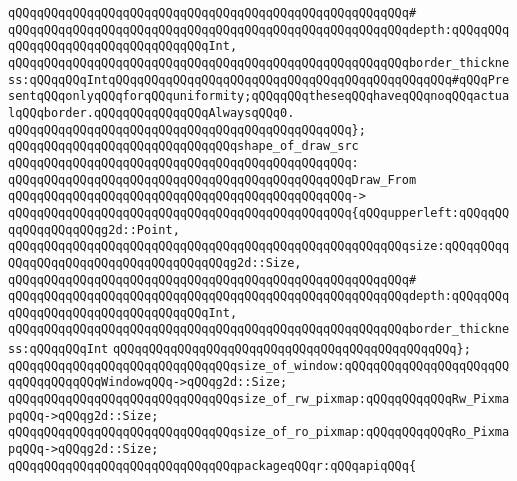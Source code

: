 \verb|qQQqqQQqqQQqqQQqqQQqqQQqqQQqqQQqqQQqqQQqqQQqqQQqqQQqqQQq#|\newline
\verb|qQQqqQQqqQQqqQQqqQQqqQQqqQQqqQQqqQQqqQQqqQQqqQQqqQQqqQQqdepth:qQQqqQQqqQQqqQQqqQQqqQQqqQQqqQQqqQQqInt,|\newline
\verb|qQQqqQQqqQQqqQQqqQQqqQQqqQQqqQQqqQQqqQQqqQQqqQQqqQQqqQQqborder_thickness:qQQqqQQqIntqQQqqQQqqQQqqQQqqQQqqQQqqQQqqQQqqQQqqQQqqQQqqQQq#qQQqPresentqQQqonlyqQQqforqQQquniformity;qQQqqQQqtheseqQQqhaveqQQqnoqQQqactualqQQqborder.qQQqqQQqqQQqqQQqAlwaysqQQq0.|\newline
\verb|qQQqqQQqqQQqqQQqqQQqqQQqqQQqqQQqqQQqqQQqqQQqqQQq};|\newline
\newline
\verb|qQQqqQQqqQQqqQQqqQQqqQQqqQQqqQQqshape_of_draw_src|\newline
\verb|qQQqqQQqqQQqqQQqqQQqqQQqqQQqqQQqqQQqqQQqqQQqqQQq:|\newline
\verb|qQQqqQQqqQQqqQQqqQQqqQQqqQQqqQQqqQQqqQQqqQQqqQQqDraw_From|\newline
\verb|qQQqqQQqqQQqqQQqqQQqqQQqqQQqqQQqqQQqqQQqqQQqqQQq->|\newline
\verb|qQQqqQQqqQQqqQQqqQQqqQQqqQQqqQQqqQQqqQQqqQQqqQQq{qQQqupperleft:qQQqqQQqqQQqqQQqqQQqg2d::Point,|\newline
\verb|qQQqqQQqqQQqqQQqqQQqqQQqqQQqqQQqqQQqqQQqqQQqqQQqqQQqqQQqsize:qQQqqQQqqQQqqQQqqQQqqQQqqQQqqQQqqQQqqQQqg2d::Size,|\newline
\verb|qQQqqQQqqQQqqQQqqQQqqQQqqQQqqQQqqQQqqQQqqQQqqQQqqQQqqQQq#|\newline
\verb|qQQqqQQqqQQqqQQqqQQqqQQqqQQqqQQqqQQqqQQqqQQqqQQqqQQqqQQqdepth:qQQqqQQqqQQqqQQqqQQqqQQqqQQqqQQqqQQqInt,|\newline
\verb|qQQqqQQqqQQqqQQqqQQqqQQqqQQqqQQqqQQqqQQqqQQqqQQqqQQqqQQqborder_thickness:qQQqqQQqInt|\newline
\verb|qQQqqQQqqQQqqQQqqQQqqQQqqQQqqQQqqQQqqQQqqQQqqQQq};|\newline
\newline
\verb|qQQqqQQqqQQqqQQqqQQqqQQqqQQqqQQqsize_of_window:qQQqqQQqqQQqqQQqqQQqqQQqqQQqqQQqqQQqWindowqQQq->qQQqg2d::Size;|\newline
\verb|qQQqqQQqqQQqqQQqqQQqqQQqqQQqqQQqsize_of_rw_pixmap:qQQqqQQqqQQqRw_PixmapqQQq->qQQqg2d::Size;|\newline
\verb|qQQqqQQqqQQqqQQqqQQqqQQqqQQqqQQqsize_of_ro_pixmap:qQQqqQQqqQQqRo_PixmapqQQq->qQQqg2d::Size;|\newline
\newline
\verb|qQQqqQQqqQQqqQQqqQQqqQQqqQQqqQQqpackageqQQqr:qQQqapiqQQq{|\newline
